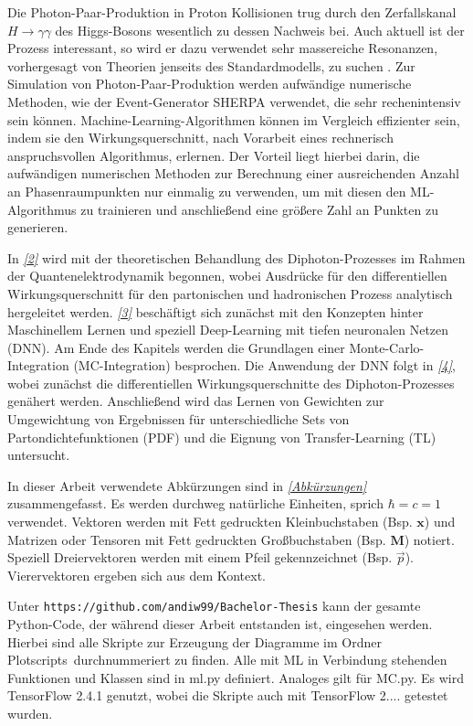 Die Photon-Paar-Produktion in Proton Kollisionen trug durch den Zerfallskanal $H \rightarrow \gamma \gamma$ des Higgs-Bosons wesentlich zu dessen Nachweis  \cite{Higgs-Disco, Higgs-Dicso-CMS} bei. Auch aktuell ist der Prozess interessant, so wird er dazu verwendet sehr massereiche Resonanzen, vorhergesagt von Theorien jenseits des Standardmodells, zu suchen \cite{diphoton-aktuell}. Zur Simulation von Photon-Paar-Produktion werden aufwändige numerische Methoden, wie der Event-Generator SHERPA \cite{SHERPA} verwendet, die sehr rechenintensiv sein können. Machine-Learning-Algorithmen können im Vergleich effizienter sein, indem sie den Wirkungsquerschnitt, nach Vorarbeit eines rechnerisch anspruchsvollen Algorithmus, erlernen. Der Vorteil liegt hierbei darin, die aufwändigen numerischen Methoden zur Berechnung einer ausreichenden Anzahl an Phasenraumpunkten nur einmalig zu verwenden, um mit diesen den ML-Algorithmus zu trainieren und anschließend eine größere Zahl an Punkten zu generieren.

In \textit{\autoref{2}} wird mit der theoretischen Behandlung des Diphoton-Prozesses im Rahmen der Quantenelektrodynamik begonnen, wobei Ausdrücke für den differentiellen Wirkungsquerschnitt für den partonischen und hadronischen Prozess analytisch hergeleitet werden. \textit{\autoref{3}} beschäftigt sich zunächst mit den Konzepten hinter Maschinellem Lernen und speziell Deep-Learning mit tiefen neuronalen Netzen (DNN). Am Ende des Kapitels werden die Grundlagen einer Monte-Carlo-Integration (MC-Integration) besprochen. Die Anwendung der DNN folgt in \textit{\autoref{4}}, wobei zunächst die differentiellen Wirkungsquerschnitte des Diphoton-Prozesses genähert werden. Anschließend wird das Lernen von Gewichten zur Umgewichtung von Ergebnissen für unterschiedliche Sets von Partondichtefunktionen (PDF) und die Eignung von Transfer-Learning (TL) untersucht. 

In dieser Arbeit verwendete Abkürzungen sind in \textit{\autoref{Abkürzungen}} zusammengefasst.
Es werden durchweg natürliche Einheiten, sprich $\hbar = c = 1$ verwendet. Vektoren werden mit Fett gedruckten Kleinbuchstaben (Bsp. $\mathbf{x}$) und Matrizen oder Tensoren mit Fett gedruckten Großbuchstaben (Bsp. $\mathbf{M}$) notiert. Speziell Dreiervektoren werden mit einem Pfeil gekennzeichnet (Bsp. $\vec{p}$). Vierervektoren ergeben sich aus dem Kontext. 

Unter \texttt{https://github.com/andiw99/Bachelor-Thesis} kann der gesamte Python-Code, der während dieser Arbeit entstanden ist, eingesehen werden. Hierbei sind alle Skripte zur Erzeugung der Diagramme im Ordner \glqq Plotscripts\grqq~durchnummeriert zu finden. Alle mit ML in Verbindung stehenden Funktionen und Klassen sind in ml.py definiert. Analoges gilt für MC.py. Es wird TensorFlow \cite{TF} 2.4.1 genutzt, wobei die Skripte auch mit TensorFlow 2.... getestet wurden.

